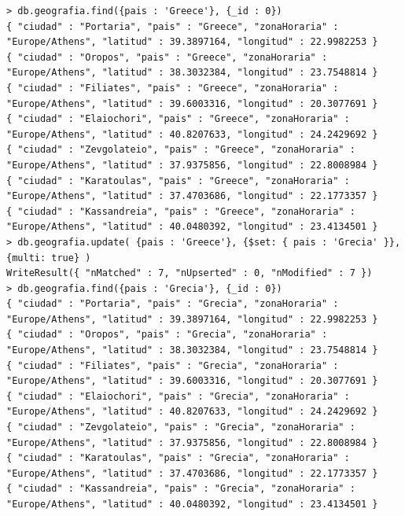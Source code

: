 \documentclass[4paper]{article}
\begin{document}
\begin{lstlisting}
> db.geografia.find({pais : 'Greece'}, {_id : 0})
{ "ciudad" : "Portaria", "pais" : "Greece", "zonaHoraria" : "Europe/Athens", "latitud" : 39.3897164, "longitud" : 22.9982253 }
{ "ciudad" : "Oropos", "pais" : "Greece", "zonaHoraria" : "Europe/Athens", "latitud" : 38.3032384, "longitud" : 23.7548814 }
{ "ciudad" : "Filiates", "pais" : "Greece", "zonaHoraria" : "Europe/Athens", "latitud" : 39.6003316, "longitud" : 20.3077691 }
{ "ciudad" : "Elaiochori", "pais" : "Greece", "zonaHoraria" : "Europe/Athens", "latitud" : 40.8207633, "longitud" : 24.2429692 }
{ "ciudad" : "Zevgolateio", "pais" : "Greece", "zonaHoraria" : "Europe/Athens", "latitud" : 37.9375856, "longitud" : 22.8008984 }
{ "ciudad" : "Karatoulas", "pais" : "Greece", "zonaHoraria" : "Europe/Athens", "latitud" : 37.4703686, "longitud" : 22.1773357 }
{ "ciudad" : "Kassandreia", "pais" : "Greece", "zonaHoraria" : "Europe/Athens", "latitud" : 40.0480392, "longitud" : 23.4134501 }
> db.geografia.update( {pais : 'Greece'}, {$set: { pais : 'Grecia' }}, {multi: true} )
WriteResult({ "nMatched" : 7, "nUpserted" : 0, "nModified" : 7 })
> db.geografia.find({pais : 'Grecia'}, {_id : 0})
{ "ciudad" : "Portaria", "pais" : "Grecia", "zonaHoraria" : "Europe/Athens", "latitud" : 39.3897164, "longitud" : 22.9982253 }
{ "ciudad" : "Oropos", "pais" : "Grecia", "zonaHoraria" : "Europe/Athens", "latitud" : 38.3032384, "longitud" : 23.7548814 }
{ "ciudad" : "Filiates", "pais" : "Grecia", "zonaHoraria" : "Europe/Athens", "latitud" : 39.6003316, "longitud" : 20.3077691 }
{ "ciudad" : "Elaiochori", "pais" : "Grecia", "zonaHoraria" : "Europe/Athens", "latitud" : 40.8207633, "longitud" : 24.2429692 }
{ "ciudad" : "Zevgolateio", "pais" : "Grecia", "zonaHoraria" : "Europe/Athens", "latitud" : 37.9375856, "longitud" : 22.8008984 }
{ "ciudad" : "Karatoulas", "pais" : "Grecia", "zonaHoraria" : "Europe/Athens", "latitud" : 37.4703686, "longitud" : 22.1773357 }
{ "ciudad" : "Kassandreia", "pais" : "Grecia", "zonaHoraria" : "Europe/Athens", "latitud" : 40.0480392, "longitud" : 23.4134501 }
\end{lstlisting}

\newpage
\end{document}

